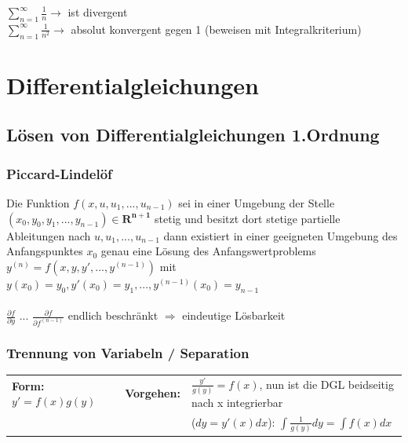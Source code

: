 $\sum\limits_{n=1}^{\infty} \frac{1}{n} \rightarrow$ ist divergent \\
$\sum\limits_{n=1}^{\infty} \frac{1}{n^2} \rightarrow$ absolut konvergent gegen 1 (beweisen mit Integralkriterium)



\newpage
\section{Differentialgleichungen}

\subsection{Lösen von Differentialgleichungen 1.Ordnung}

\subsubsection{Piccard-Lindelöf}
Die Funktion $f(x, u, u_1, ..., u_{n-1})$ sei in einer Umgebung der Stelle $(x_0, y_0, y_1, ..., y_{n-1}) \in \mathbf{R^{n+1}}$ stetig und besitzt dort stetige partielle Ableitungen
nach $u, u_1, ..., u_{n-1}$ dann existiert in einer geeigneten Umgebung des Anfangspunktes $x_0$ genau eine Lösung des Anfangswertproblems\\
$y^{(n)} = f(x, y, y', ...,y^{(n-1)})$ mit $y(x_0) = y_0, y'(x_0) = y_1, ..., y^{(n-1)}(x_0) = y_{n-1}$ \\ \\
$\frac{\partial f}{\partial y}$ ... $\frac{\partial f}{\partial f^{(n-1)}}$ endlich beschränkt $\Rightarrow$ eindeutige Lösbarkeit


\subsubsection{Trennung von Variabeln / Separation }
\begin{tabular}{p{4cm}p{1.5cm}p{10.5cm}}
\textbf{Form:} $y' = f(x) g(y)$ &
\textbf{Vorgehen:}              &
$\frac{y'}{g(y)} = f(x)$, nun ist die DGL beidseitig nach x integrierbar\\  &&
($dy = y'(x) dx$): $\int \frac{1}{g(y)} dy = \int f(x) dx$ 
\end{tabular}

